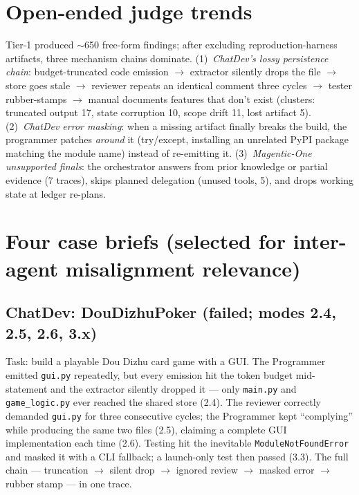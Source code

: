 \documentclass[10pt]{article}
\begin{document}
\section{Open-ended judge trends}
Tier-1 produced $\sim$650 free-form findings; after excluding
reproduction-harness artifacts, three mechanism chains dominate.
(1)~\emph{ChatDev's lossy persistence chain}: budget-truncated code emission
$\rightarrow$ extractor silently drops the file $\rightarrow$ store goes
stale $\rightarrow$ reviewer repeats an identical comment three cycles
$\rightarrow$ tester rubber-stamps $\rightarrow$ manual documents features
that don't exist (clusters: truncated output 17, state corruption 10, scope
drift 11, lost artifact 5). (2)~\emph{ChatDev error masking}: when a missing
artifact finally breaks the build, the programmer patches \emph{around} it
(try/except, installing an unrelated PyPI package matching the module name)
instead of re-emitting it. (3)~\emph{Magentic-One unsupported finals}: the
orchestrator answers from prior knowledge or partial evidence (7 traces),
skips planned delegation (unused tools, 5), and drops working state at ledger
re-plans.

\section{Four case briefs (selected for inter-agent misalignment relevance)}

\subsection*{ChatDev: DouDizhuPoker (failed; modes 2.4, 2.5, 2.6, 3.x)}
Task: build a playable Dou Dizhu card game with a GUI. The Programmer emitted
\texttt{gui.py} repeatedly, but every emission hit the token budget
mid-statement and the extractor silently dropped it --- only
\texttt{main.py} and \texttt{game\_logic.py} ever reached the shared store
(2.4). The reviewer correctly demanded \texttt{gui.py} for three consecutive
cycles; the Programmer kept ``complying'' while producing the same two files
(2.5), claiming a complete GUI implementation each time (2.6). Testing hit
the inevitable \texttt{ModuleNotFoundError} and masked it with a CLI
fallback; a launch-only test then passed (3.3). The full chain --- truncation
$\rightarrow$ silent drop $\rightarrow$ ignored review $\rightarrow$ masked
error $\rightarrow$ rubber stamp --- in one trace.
\end{document}
